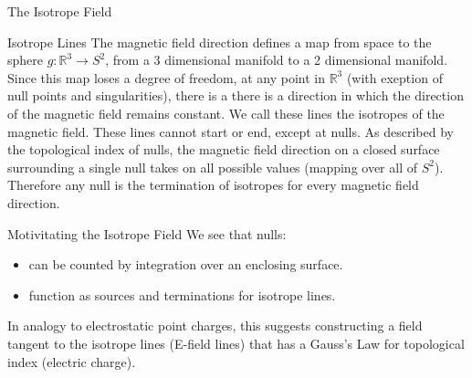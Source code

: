\documentclass[final]{beamer}
\newlength{\onecolwid}
\begin{document}
\begin{frame}[t]
\begin{columns}[t]
\begin{column}{\onecolwid}
\begin{block}{\huge{The Isotrope Field}}
\begin{block}{Isotrope Lines}
  The magnetic field direction defines a map from space to the sphere $g:\mathbb{R}^3\rightarrow S^2$,
  from a 3 dimensional manifold to a 2 dimensional manifold.
  Since this map loses a degree of freedom,
  at any point in $\mathbb{R}^3$ (with exeption of null points and singularities),
  there is a there is a direction in which the direction
  of the magnetic field remains constant.
  We call these lines the isotropes of the magnetic field.
  These lines cannot start or end, except at nulls.
  As described by the topological index of nulls, the magnetic field direction
  on a closed surface surrounding a single null takes on all possible values (mapping over all of $S^2$).
  Therefore any null is the termination of isotropes for every magnetic field direction.
\end{block}

\begin{block}{Motivitating the Isotrope Field}
  We see that nulls:
  \begin{itemize}
  \item can be counted by integration over an enclosing surface.
  \item function as sources and terminations for isotrope lines.
  \end{itemize}
  In analogy to electrostatic point charges,
  this suggests constructing a field tangent to the isotrope lines (E-field lines)
  that has a Gauss's Law for topological index (electric charge).
\end{block}


\end{block}
\end{column}
\end{columns}
\end{frame}
\end{document}
